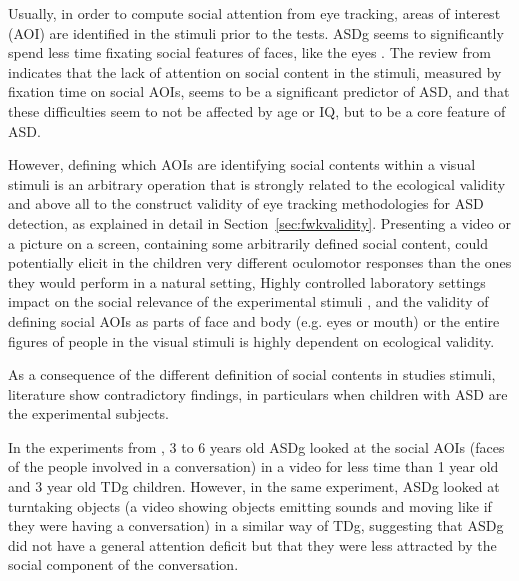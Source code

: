 Usually, in order to compute social attention from eye tracking, areas of interest (AOI) are identified in the stimuli prior to the tests. ASDg seems to significantly spend less time fixating social features of faces, like the eyes \citep{papagiannopoulou2014review, boraston2007eyetrackingASD}. The review from \cite{chitategmark2016socialattention} indicates that the lack of attention on social content in the stimuli, measured by fixation time on social AOIs, seems to be a significant predictor of ASD, and that these difficulties seem to not be affected by age or IQ, but to be a core feature of ASD.

However, defining which AOIs are identifying social contents within a visual stimuli is an arbitrary operation that is strongly related to the ecological validity and above all to the construct validity of eye tracking methodologies for ASD detection, as explained in detail in Section~\ref{sec:fwkvalidity}. Presenting a video or a picture on a screen, containing some arbitrarily defined social content, could potentially elicit in the children very different oculomotor responses than the ones they would perform in a natural setting, Highly controlled laboratory settings impact on the social relevance of the experimental stimuli \citep{papagiannopoulou2014review}, and the validity of defining social AOIs as parts of face and body (e.g. eyes or mouth) or the entire figures of people in the visual stimuli is highly dependent on ecological validity.

As a consequence of the different definition of social contents in studies stimuli, literature show contradictory findings, in particulars when children with ASD are the experimental subjects.

In the experiments from \cite{vonhofsten2009lookingevents}, 3 to 6 years old ASDg looked at the social AOIs (faces of the people involved in a conversation) in a video for less time than 1 year old and 3 year old TDg children. However, in the same experiment, ASDg looked at turntaking objects (a video showing objects emitting sounds and moving like if they were having a conversation) in a similar way of TDg, suggesting that ASDg did not have a general attention deficit but that they were less attracted by the social component of the conversation. 

